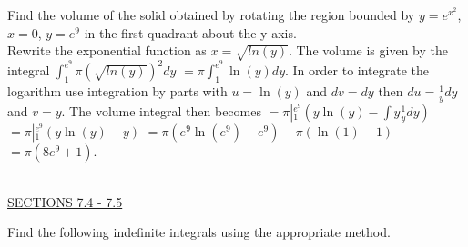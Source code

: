 \documentclass{exam}
\begin{document}
\begin{questions}
\question Find the volume of the solid obtained by rotating the region bounded by $y=e^{x^2}$, $x=0$, $y = e^{9}$ in the first quadrant about the y-axis.
\\ {\color{red} Rewrite the exponential function as $x = \sqrt{ ln(y) }$.  The volume is given by the integral $\displaystyle\int_1^{e^{9}} \pi \left( \sqrt{ ln(y) } \right)^2 dy$ $ = \pi \displaystyle\int_1^{e^9} \ln(y) dy$.  In order to integrate the logarithm use integration by parts with $u=\ln(y)$ and $dv=dy$ then $du = \frac{1}{y} dy$ and $v=y$.  The volume integral then becomes $=\pi \left|_1^{e^9}\left(  y\ln(y) - \displaystyle\int y \frac{1}{y}dy \right) \right.$ $ =\pi \left|_1^{e^9}\left(  y\ln(y) - y \right) \right.  $ $ = \pi(e^9\ln(e^9) - e^9) - \pi(\ln(1) - 1)$ $ =  \pi(8e^9 + 1)$.  }




\ \\
\underline{SECTIONS 7.4 - 7.5 }

\question Find the following indefinite integrals using the appropriate method.  
\begin{parts}
\end{parts}
\end{questions}
\end{document}
